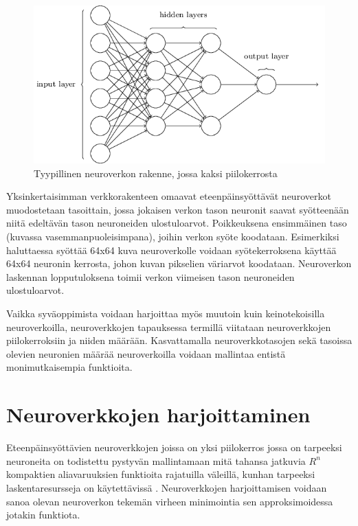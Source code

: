 \documentclass[finnish]{tktltiki2}
\theoremstyle{definition}
\theoremstyle{remark}
\begin{document}
  \begin{figure}[h]
  \label{pic:neuralnet}
  \centering
  \includegraphics[scale=0.5]{basic-neuralnet}
  \caption{Tyypillinen neuroverkon rakenne, jossa kaksi piilokerrosta \cite{Nielsen-neural}}
  \end{figure}

  Yksinkertaisimman verkkorakenteen omaavat eteenpäinsyöttävät neuroverkot muodostetaan tasoittain, jossa jokaisen verkon tason neuronit saavat syötteenään niitä edeltävän tason neuroneiden ulostuloarvot. Poikkeuksena ensimmäinen taso (kuvassa vasemmanpuoleisimpana), joihin verkon syöte koodataan. Esimerkiksi haluttaessa syöttää 64x64 kuva neuroverkolle voidaan syötekerroksena käyttää 64x64 neuronin kerrosta, johon kuvan pikselien väriarvot koodataan. Neuroverkon laskennan lopputuloksena toimii verkon viimeisen tason neuroneiden ulostuloarvot.

  Vaikka syväoppimista voidaan harjoittaa myös muutoin kuin keinotekoisilla neuroverkoilla, neuroverkkojen tapauksessa termillä viitataan neuroverkkojen piilokerroksiin ja niiden määrään. Kasvattamalla neuroverkkotasojen sekä tasoissa olevien neuronien määrää neuroverkoilla voidaan mallintaa entistä monimutkaisempia funktioita.

  \section{Neuroverkkojen harjoittaminen}

  Eteenpäinsyöttävien neuroverkkojen joissa on yksi piilokerros jossa on tarpeeksi neuroneita on todistettu pystyvän mallintamaan mitä tahansa jatkuvia $R^n$ kompaktien aliavaruuksien funktioita rajatuilla väleillä, kunhan tarpeeksi laskentaresursseja on käytettävissä \cite{multilayer-feedforward-universal-approximators}. Neuroverkkojen harjoittamisen voidaan sanoa olevan neuroverkon tekemän virheen minimointia sen approksimoidessa jotakin funktiota.
\end{document}
